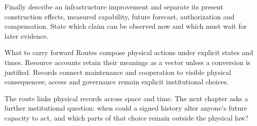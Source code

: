 Finally describe an infrastructure improvement and separate its present construction effects, measured capability, future forecast, authorization and compensation. State which claim can be observed now and which must wait for later evidence.

\begin{intuitionbox}{What to carry forward}
Routes compose physical actions under explicit states and times. Resource accounts retain their meanings as a vector unless a conversion is justified. Records connect maintenance and cooperation to visible physical consequences; access and governance remain explicit institutional choices.
\end{intuitionbox}

The route links physical records across space and time. The next chapter asks a further institutional question: when could a signed history alter anyone's future capacity to act, and which parts of that choice remain outside the physical law?
